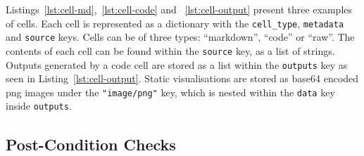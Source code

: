 \documentclass[conference]{IEEEtran}
\begin{document}
Listings~\ref{lst:cell-md},~\ref{lst:cell-code} and ~\ref{lst:cell-output} present three examples of cells. Each cell is represented as a dictionary with the \texttt{cell\_type}, \texttt{metadata} and \texttt{source} keys. Cells can be of three types: ``markdown'', ``code'' or ``raw''. The contents of each cell can be found within the \texttt{source} key, as a list of strings.
Outputs generated by a code cell are stored as a list within the
\texttt{outputs} key as seen in Listing~\ref{lst:cell-output}. Static
visualisations are stored as base64 encoded png images under the
\texttt{"image/png"} key, which is nested within the \texttt{data} key
inside \texttt{outputs}.

\subsection{Post-Condition Checks}\label{sec:post-cond}
\end{document}
